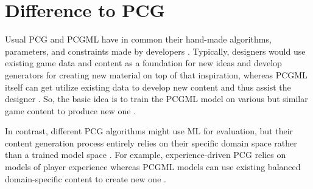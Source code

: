 \documentclass[MGS,Master,english]{twbook}%
\begin{document}
\section{Difference to \acl{PCG}}
Usual \ac{PCG} and \ac{PCGML} have in common their hand-made algorithms, parameters, and constraints made by developers \cite{pcgml::paper}. Typically, designers would use existing game data and content as a foundation for new ideas and develop generators for creating new material on top of that inspiration, whereas \ac{PCGML} itself can get utilize existing data to develop new content and thus assist the designer \cite{pcgml::paper}. So, the basic idea is to train the \ac{PCGML} model on various but similar game content to produce new one \cite{pcgml::paper}. 

In contrast, different \ac{PCG} algorithms might use \ac{ML} for evaluation, but their content generation process entirely relies on their specific domain space rather than a trained model space \cite{pcgml::paper}. For example, experience-driven \ac{PCG} relies on models of player experience whereas \ac{PCGML} models can use existing balanced domain-specific content to create new one \cite{pcgml::paper}.
\end{document}
